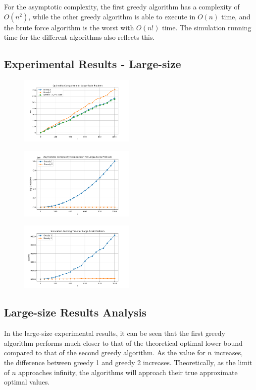 \documentclass[11pt]{article}
\begin{document}
For the asymptotic complexity, the first greedy algorithm has a complexity of ${O(n^2)}$, while the
other greedy algorithm is able to execute in ${O({n})}$ time, and the brute force algorithm is the
worst with ${O(n!)}$ time. The simulation running time for the different algorithms also reflects
this.

\subsection{Experimental Results - Large-size}
\begin{figure}[H]
	\centering
	\includegraphics[width=0.5\textwidth]{images/largescale_optimality.png}
\end{figure}
\begin{figure}[H]
	\centering
	\includegraphics[width=0.5\textwidth]{images/largescale_complexity.png}
\end{figure}
\begin{figure}[H]
	\centering
	\includegraphics[width=0.5\textwidth]{images/largescale_simtime.png}
\end{figure}

\subsection{Large-size Results Analysis}
In the large-size experimental results, it can be seen that the first greedy algorithm performs
much closer to that of the theoretical optimal lower bound compared to that of the second greedy
algorithm. As the value for ${n}$ increases, the difference between greedy 1 and greedy 2
increases. Theoretically, as the limit of ${n}$ approaches infinity, the algorithms will
approach their true approximate optimal values.
\end{document}
